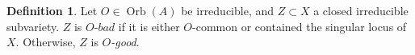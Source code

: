 \documentclass{amsart}
\theoremstyle{definition}
\newtheorem{definition}[theorem]{Definition}
\begin{document}
\begin{definition}\label{D: good}
    Let $O\in\operatorname{Orb}(A)$ be irreducible, and $Z\subset X$ a closed irreducible subvariety. $Z$ is $\textit{$O$-bad}$ if it is either $O$-common or contained the singular locus of $X$. Otherwise, $Z$ is \textit{$O$-good}.
\end{definition}





\end{document}

